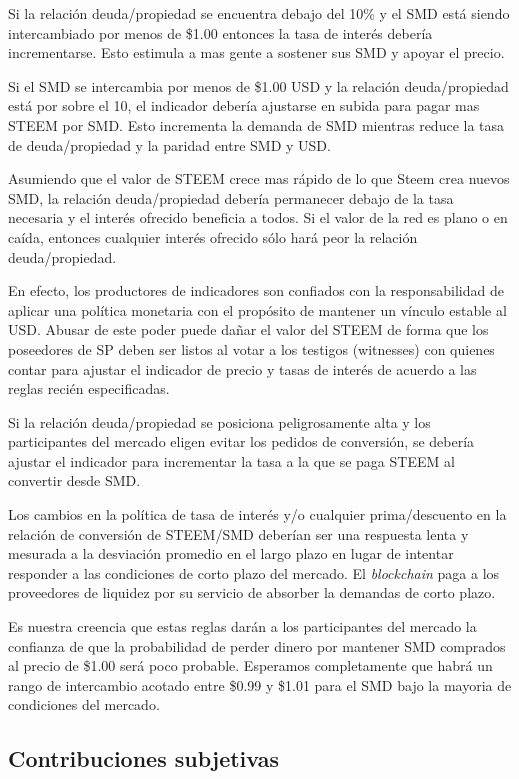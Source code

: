 \documentclass[a4paper,titlepage,final]{article}
\begin{document}
Si la relación deuda/propiedad se encuentra debajo del 10\% y el SMD está siendo intercambiado por menos de \$1.00 entonces la tasa de interés debería incrementarse. Esto estimula a mas gente a sostener sus SMD y apoyar el precio.

Si el SMD se intercambia por menos de \$1.00 USD y la relación deuda/propiedad está por sobre el 10, el indicador debería ajustarse en subida para pagar mas STEEM por SMD. Esto incrementa la demanda de SMD mientras reduce la tasa de deuda/propiedad y la paridad entre SMD y USD.

Asumiendo que el valor de STEEM crece mas rápido de lo que Steem crea nuevos SMD, la relación deuda/propiedad debería permanecer debajo de la tasa necesaria y el interés ofrecido beneficia a todos. Si el valor de la red es plano o en caída, entonces cualquier interés ofrecido sólo hará peor la relación deuda/propiedad.

En efecto, los productores de indicadores son confiados con la responsabilidad de aplicar una política monetaria con el propósito de mantener un vínculo estable al USD. Abusar de este poder puede dañar el valor del STEEM de forma que los poseedores de SP deben ser listos al votar a los testigos (witnesses) con quienes contar para ajustar el indicador de precio y tasas de interés de acuerdo a las reglas recién especificadas.

Si la relación deuda/propiedad se posiciona peligrosamente alta y los participantes del mercado eligen evitar los pedidos de conversión, se debería ajustar el indicador para incrementar la tasa a la que se paga STEEM al convertir desde SMD.

Los cambios en la política de tasa de interés y/o cualquier prima/descuento en la relación de conversión de STEEM/SMD deberían ser una respuesta lenta y mesurada a la desviación promedio en el largo plazo en lugar de intentar responder a las condiciones de corto plazo del mercado. El \textit{blockchain} paga a los proveedores de liquidez por su servicio de absorber la demandas de corto plazo.

Es nuestra creencia que estas reglas darán a los participantes del mercado la confianza de que la probabilidad de perder dinero por mantener SMD comprados al precio de \$1.00 será poco probable. Esperamos completamente que habrá un rango de intercambio acotado entre \$0.99 y \$1.01 para el SMD bajo la mayoria de condiciones del mercado.

\subsection{Contribuciones subjetivas}
\end{document}
